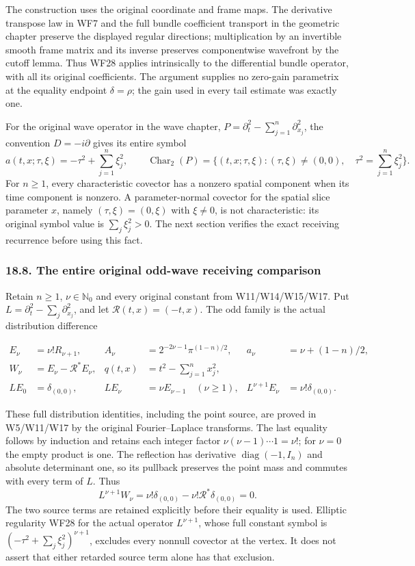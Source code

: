 \documentclass[
  11pt,
]{article}
\begin{document}
The construction uses the original coordinate and frame maps. The
derivative transpose law in WF7 and the full bundle coefficient
transport in the geometric chapter preserve the displayed regular
directions; multiplication by an invertible smooth frame matrix and its
inverse preserves componentwise wavefront by the cutoff lemma. Thus WF28
applies intrinsically to the differential bundle operator, with all its
original coefficients. The argument supplies no zero-gain parametrix at
the equality endpoint \(\delta=\rho\); the gain used in every tail
estimate was exactly one.

For the original wave operator in the wave chapter,
\(P=\partial_t^2-\sum_{j=1}^n\partial_{x_j}^2\), the convention
\(D=-i\partial\) gives its entire symbol \[
a(t,x;\tau,\xi)=-\tau^2+\sum_{j=1}^n\xi_j^2,\qquad
\operatorname{Char}_2(P)=
\{(t,x;\tau,\xi):(\tau,\xi)\ne(0,0),\quad
                        \tau^2=\sum_{j=1}^n\xi_j^2\}.
\tag{WF29}
\] For \(n\geq1\), every characteristic covector has a nonzero spatial
component when its time component is nonzero. A parameter-normal
covector for the spatial slice parameter \(x\), namely
\((\tau,\xi)=(0,\xi)\) with \(\xi\ne0\), is not characteristic: its
original symbol value is \(\sum_j\xi_j^2>0\). The next section verifies
the exact receiving recurrence before using this fact.

\subsubsection{18.8. The entire original odd-wave receiving
comparison}\label{the-entire-original-odd-wave-receiving-comparison}

Retain \(n\geq1\), \(\nu\in\mathbb N_0\) and every original constant
from W11/W14/W15/W17. Put \(L=\partial_t^2-\sum_j\partial_{x_j}^2\), and
let \(\mathcal R(t,x)=(-t,x)\). The odd family is the actual
distribution difference

\[
\begin{aligned}
E_\nu&=\nu!R_{\nu+1},&
A_\nu&=2^{-2\nu-1}\pi^{(1-n)/2},&
a_\nu&=\nu+(1-n)/2,\\
W_\nu&=E_\nu-\mathcal R^*E_\nu,&
q(t,x)&=t^2-\sum_{j=1}^n x_j^2,\\
LE_0&=\delta_{(0,0)},&
LE_\nu&=\nu E_{\nu-1}\quad(\nu\geq1),&
L^{\nu+1}E_\nu&=\nu!\delta_{(0,0)}.
\end{aligned}
\tag{WF30}
\]

These full distribution identities, including the point source, are
proved in W5/W11/W17 by the original Fourier--Laplace transforms. The
last equality follows by induction and retains each integer factor
\(\nu(\nu-1)\cdots1=\nu!\); for \(\nu=0\) the empty product is one. The
reflection has derivative \(\operatorname{diag}(-1,I_n)\) and absolute
determinant one, so its pullback preserves the point mass and commutes
with every term of \(L\). Thus \[
L^{\nu+1}W_\nu
=\nu!\delta_{(0,0)}-\nu!\mathcal R^*\delta_{(0,0)}
=0 .
\tag{WF31}
\] The two source terms are retained explicitly before their equality is
used. Elliptic regularity WF28 for the actual operator \(L^{\nu+1}\),
whose full constant symbol is \((-\tau^2+\sum_j\xi_j^2)^{\nu+1}\),
excludes every nonnull covector at the vertex. It does not assert that
either retarded source term alone has that exclusion.
\end{document}
